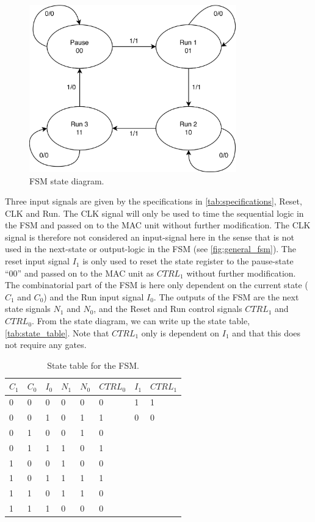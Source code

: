 \begin{figure}[H]
    \centering
    \includegraphics[width=0.8\textwidth]{Figures/FSM-diagram.png}
    \caption{FSM state diagram.}
    \label{fig:fsm_diagram}
\end{figure}

Three input signals are given by the specifications in \autoref{tab:specifications}, Reset, CLK and Run. The CLK signal
will only be used to time the sequential logic in the FSM and passed on to the MAC unit without
further modification. The CLK signal is therefore not considered an input-signal here in the sense that is not used in the next-state or output-logic in the FSM (see \autoref{fig:general_fsm}). The reset input signal $I_1$ is only used to reset the state register to the pause-state ``00'' and passed on to the MAC unit as $CTRL_1$ without further modification. The combinatorial part of the FSM is here only dependent on the current state ($C_1$ and $C_0$) and the Run input signal $I_0$. The outputs of the FSM are the next state signals $N_1$ and $N_0$, and the Reset and Run control signals $CTRL_1$ and $CTRL_0$. From the state diagram, we can write up the state table, \autoref{tab:state_table}. Note that $CTRL_1$ only is dependent on $I_1$ and that this does not require any gates.

\begin{table}[H]
\caption{State table for the FSM.}
\label{tab:state_table}
\centering
\begin{tabular}{|l|l|l|l|l|l||l|l|}
\hline
\rowcolor[HTML]{C0C0C0} 
$C_1$ & $C_0$ & $I_0$ & $N_1$ & $N_0$ & $CTRL_0$ & $I_1$ & $CTRL_1$\\
\hline
0  & 0  & 0  & 0   & 0   & 0 & 1 & 1\\ 
\hline
0  & 0  & 1  & 0   & 1   & 1 & 0 & 0\\ 
\hline
0  & 1  & 0  & 0   & 1   & 0 \\ 
\cline{1-6}
0  & 1  & 1  & 1   & 0   & 1 \\ 
\cline{1-6}
1  & 0  & 0  & 1   & 0   & 0 \\ 
\cline{1-6}
1  & 0  & 1  & 1   & 1   & 1 \\ 
\cline{1-6}
1  & 1  & 0  & 1   & 1   & 0 \\ 
\cline{1-6}
1  & 1  & 1  & 0   & 0   & 0 \\ 
\cline{1-6}

\end{tabular}
\end{table}

